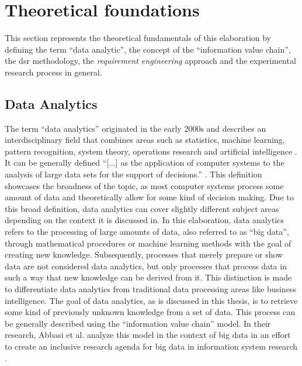 \newpage\section{Theoretical foundations}

This section represents the theoretical fundamentals of this elaboration by defining the term \enquote{data analytic}, the concept of the \enquote{information value chain}, the \ac{dsr} methodology, the \textit{requirement engineering} approach and the experimental research process in general.


\subsection{Data Analytics}

The term \enquote{data analytics} originated in the early 2000s and describes an interdisciplinary field that combines areas such as statistics, machine learning, pattern recognition, system theory, operations research and artificial intelligence \parencite{Runkler.2020}. It can be generally defined \enquote{[...] as the application of computer systems to the analysis of large data sets for the support of decisions.} \parencite{Runkler.2020}. This definition showcases the broadness of the topic, as most computer systems process some amount of data and theoretically allow for some kind of decision making. Due to this broad definition, data analytics can cover slightly different subject areas depending on the context it is discussed in. In this elaboration, data analytics refers to the processing of large amounts of data, also referred  to as \enquote{big data}, through mathematical procedures or machine learning methods with the goal of creating new knowledge. Subsequently, processes that merely prepare or show data are not considered data analytics, but only processes that process data in such a way that new knowledge can be derived from it. This distinction is made to differentiate data analytics from traditional data processing areas like business intelligence. The goal of data analytics, as is discussed in this thesis, is to retrieve some kind of previously unknown knowledge from a set of data. This process can be generally described using the \enquote{information value chain} model. In their research, Abbasi et al. analyze this model in the context of big data in an effort to create an inclusive research agenda for big data in information system research \parencite{Abbasi.2016}.

